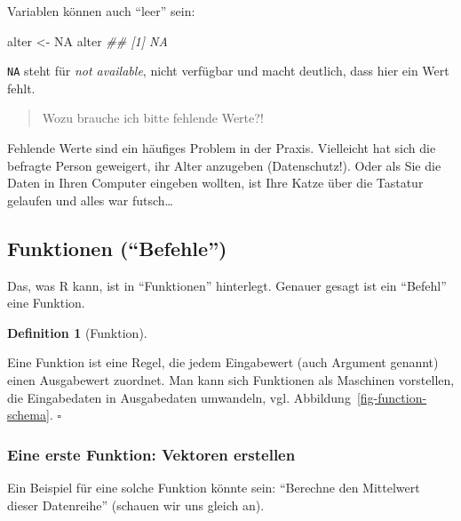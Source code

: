 \documentclass[
  letterpaper,
]{scrbook}
\newenvironment{Shaded}{\begin{snugshade}}{\end{snugshade}}
\newcommand{\ConstantTok}[1]{\textcolor[rgb]{0.56,0.35,0.01}{#1}}
\newcommand{\DocumentationTok}[1]{\textcolor[rgb]{0.37,0.37,0.37}{\textit{#1}}}
\newcommand{\NormalTok}[1]{\textcolor[rgb]{0.00,0.23,0.31}{#1}}
\newcommand{\OtherTok}[1]{\textcolor[rgb]{0.00,0.23,0.31}{#1}}
\theoremstyle{definition}
\theoremstyle{definition}
\theoremstyle{definition}
\newtheorem{definition}{Definition}[chapter]
\theoremstyle{remark}
\begin{document}
Variablen können auch \enquote{leer} sein:

\begin{Shaded}
\begin{Highlighting}[]
\NormalTok{alter }\OtherTok{\textless{}{-}} \ConstantTok{NA}
\NormalTok{alter}
\DocumentationTok{\#\# [1] NA}
\end{Highlighting}
\end{Shaded}

\texttt{NA} steht für \emph{not available}, nicht verfügbar und macht
deutlich, dass hier ein Wert fehlt.

\begin{quote}
{} Wozu brauche ich bitte fehlende Werte?!
\end{quote}

Fehlende Werte sind ein häufiges Problem in der Praxis. Vielleicht hat
sich die befragte Person geweigert, ihr Alter anzugeben (Datenschutz!).
Oder als Sie die Daten in Ihren Computer eingeben wollten, ist Ihre
Katze über die Tastatur gelaufen und alles war futsch\ldots{}

\subsection{\texorpdfstring{Funktionen
(\enquote{Befehle})}{Funktionen (``Befehle'')}}\label{funktionen-befehle}

Das, was R kann, ist in \enquote{Funktionen} hinterlegt. Genauer gesagt
ist ein \enquote{Befehl} eine Funktion.

\begin{definition}[Funktion]\protect\hypertarget{def-fun}{}\label{def-fun}

Eine Funktion ist eine Regel, die jedem Eingabewert (auch Argument
genannt) einen Ausgabewert zuordnet. Man kann sich Funktionen als
Maschinen vorstellen, die Eingabedaten in Ausgabedaten umwandeln, vgl.
Abbildung~\ref{fig-function-schema}. \(\square\)

\end{definition}

\subsubsection{Eine erste Funktion: Vektoren
erstellen}\label{eine-erste-funktion-vektoren-erstellen}

Ein Beispiel für eine solche Funktion könnte sein: \enquote{Berechne den
Mittelwert dieser Datenreihe} (schauen wir uns gleich an).
\end{document}
